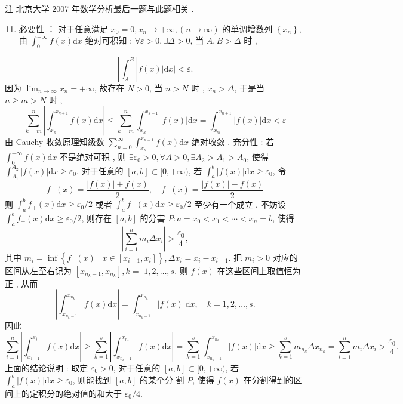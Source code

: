 \documentclass[10pt]{article}
\begin{document}
 注   北京大学  2007  年数学分析最后一题与此题相关 .

\begin{enumerate}
  \setcounter{enumi}{10}
  \item  必要性 ： 对于任意满足  $x_{0}=0, x_{n} \rightarrow+\infty,(n \rightarrow \infty)$  的单调增数列  $\left\{x_{n}\right\}$,  由  $\int_{0}^{+\infty} f(x) \mathrm{d} x$  绝对可积知 : $\forall \varepsilon>0, \exists \Delta>0$,  当  $A, B>\Delta$  时 ,
\end{enumerate}
$$
\left|\int_{A}^{B}\right| f(x)|\mathrm{d} x|<\varepsilon .
$$
 因为  $\lim _{n \rightarrow \infty} x_{n}=+\infty$,  故存在  $N>0$,  当  $n>N$  时 , $x_{n}>\Delta$,  于是当  $n \geqslant m>N$  时 ,
$$
\sum_{k=m}^{n}\left|\int_{x_{k}}^{x_{k+1}} f(x) \mathrm{d} x\right| \leqslant \sum_{k=m}^{n} \int_{x_{k}}^{x_{k+1}}|f(x)| \mathrm{d} x=\int_{x_{m}}^{x_{n+1}}|f(x)| \mathrm{d} x<\varepsilon
$$
 由  Cauchy  收敛原理知级数  $\sum_{n=0}^{\infty} \int_{x_{n}}^{x_{n+1}} f(x) \mathrm{d} x$  绝对收敛 .  充分性 :  若  $\int_{0}^{+\infty} f(x) \mathrm{d} x$  不是绝对可积 ,  则  $\exists \varepsilon_{0}>0, \forall A>0, \exists A_{2}>A_{1}>A_{0}$,  使得  $\int_{A_{1}}^{A_{2}}|f(x)| \mathrm{d} x \geqslant \varepsilon_{0}$.  对于任意的  $[a, b] \subset[0,+\infty)$,  若  $\int_{a}^{b}|f(x)| \mathrm{d} x \geqslant \varepsilon_{0}$,  令 
$$
f_{+}(x)=\frac{|f(x)|+f(x)}{2}, \quad f_{-}(x)=\frac{|f(x)|-f(x)}{2}
$$
 则  $\int_{a}^{b} f_{+}(x) \mathrm{d} x \geqslant \varepsilon_{0} / 2$  或者  $\int_{a}^{b} f_{-}(x) \mathrm{d} x \geqslant \varepsilon_{0} / 2$  至少有一个成立 .  不妨设  $\int_{a}^{b} f_{+}(x) \mathrm{d} x \geqslant \varepsilon_{0} / 2$,  则存在  $[a, b]$  的分害  $P: a=x_{0}<x_{1}<\cdots<x_{n}=b$,  使得 
$$
\left|\sum_{i=1}^{n} m_{i} \Delta x_{i}\right|>\frac{\varepsilon_{0}}{4},
$$
 其中  $m_{i}=\inf \left\{f_{+}(x) \mid x \in\left[x_{i-1}, x_{i}\right]\right\}, \Delta x_{i}=x_{i}-x_{i-1}$.  把  $m_{i}>0$  对应的区间从左至右记为  $\left[x_{n_{k}-1}, x_{n_{k}}\right], k=$ $1,2, \ldots, s$.  则  $f(x)$  在这些区间上取值恒为正 ,  从而 
$$
\left|\int_{x_{n_{k}-1}}^{x_{n_{k}}} f(x) \mathrm{d} x\right|=\int_{x_{n_{k}-1}}^{x_{n_{k}}}|f(x)| \mathrm{d} x, \quad k=1,2, \ldots, s .
$$
 因此 
$$
\sum_{i=1}^{n}\left|\int_{x_{i-1}}^{x_{i}} f(x) \mathrm{d} x\right| \geqslant \sum_{k=1}^{s}\left|\int_{x_{n_{k}-1}}^{x_{n_{k}}} f(x) \mathrm{d} x\right|=\sum_{k=1}^{s} \int_{x_{n_{k}-1}}^{x_{n_{k}}}|f(x)| \mathrm{d} x \geqslant \sum_{k=1}^{s} m_{n_{k}} \Delta x_{n_{k}}=\sum_{i=1}^{n} m_{i} \Delta x_{i}>\frac{\varepsilon_{0}}{4} .
$$
 上面的结论说明 :  取定  $\varepsilon_{0}>0$,  对于任意的  $[a, b] \subset[0,+\infty)$,  若  $\int_{a}^{b}|f(x)| \mathrm{d} x \geqslant \varepsilon_{0}$,  则能找到  $[a, b]$  的某个分   割  $P$,  使得  $f(x)$  在分割得到的区间上的定积分的绝对值的和大于  $\varepsilon_{0} / 4$.
\end{document}
